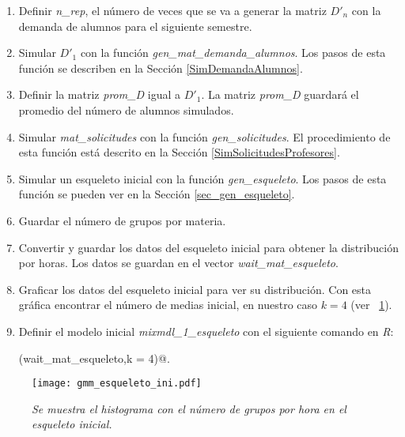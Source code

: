 \begin{enumerate}
\item Definir \textit{n\_rep}, el número de veces que se va a generar la matriz $D'_{n}$ con la demanda de alumnos para el siguiente semestre.

\item Simular $D'_{1}$ con la función \textit{gen\_mat\_demanda\_alumnos}. Los pasos de esta función se describen en la Sección \ref{SimDemandaAlumnos}.

\item Definir la matriz \textit{prom\_D} igual a $D'_{1}$. La matriz \textit{prom\_D} guardará el promedio del número de alumnos simulados.

\item Simular \textit{mat\_solicitudes} con la función \textit{gen\_solicitudes}. El procedimiento de esta función está descrito en la Sección \ref{SimSolicitudesProfesores}.

\item Simular un esqueleto inicial con la función \textit{gen\_esqueleto}. Los pasos de esta función se pueden ver en la Sección \ref{sec_gen_esqueleto}.

\item Guardar el número de grupos por materia.

\item Convertir y guardar los datos del esqueleto inicial para obtener la distribución por horas. Los datos se guardan en el vector \textit{wait\_mat\_esqueleto}.

\item Graficar los datos del esqueleto inicial para ver su distribución. Con esta gráfica encontrar el número de medias inicial, en nuestro caso $k = 4$ (ver \figurename{~\ref{hist_wait_esq_ini}}).

\item Definir el modelo inicial \textit{mixmdl\_1\_esqueleto} con el siguiente comando en \textit{R}:

\verb@normalmixEM(wait_mat_esqueleto,k = 4)@.
\end{enumerate}

\begin{figure}[H]
\centering
\texttt{[image: gmm\_esqueleto\_ini.pdf]} %
\caption[\textit{Histograma con los datos del esqueleto inicial}]{\textit{Se muestra el histograma con el número de grupos por hora en el esqueleto inicial.}}\label{hist_wait_esq_ini}
\end{figure}



